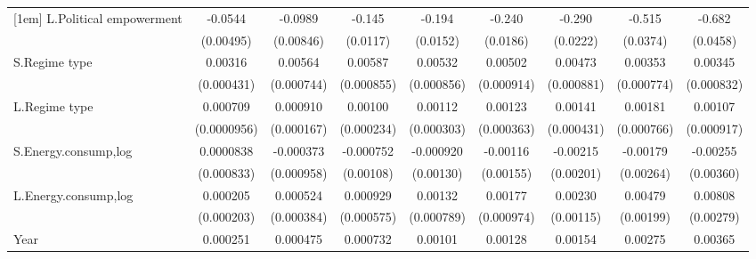 \begin{table}[htbp]
\begin{tabular}{l*{8}{c}}
[1em]
L.Political empowerment&     -0.0544\sym{***}&     -0.0989\sym{***}&      -0.145\sym{***}&      -0.194\sym{***}&      -0.240\sym{***}&      -0.290\sym{***}&      -0.515\sym{***}&      -0.682\sym{***}\\
                    &   (0.00495)         &   (0.00846)         &    (0.0117)         &    (0.0152)         &    (0.0186)         &    (0.0222)         &    (0.0374)         &    (0.0458)         \\
[1em]
S.Regime type       &     0.00316\sym{***}&     0.00564\sym{***}&     0.00587\sym{***}&     0.00532\sym{***}&     0.00502\sym{***}&     0.00473\sym{***}&     0.00353\sym{***}&     0.00345\sym{***}\\
                    &  (0.000431)         &  (0.000744)         &  (0.000855)         &  (0.000856)         &  (0.000914)         &  (0.000881)         &  (0.000774)         &  (0.000832)         \\
[1em]
L.Regime type       &    0.000709\sym{***}&    0.000910\sym{***}&     0.00100\sym{***}&     0.00112\sym{***}&     0.00123\sym{***}&     0.00141\sym{***}&     0.00181\sym{**} &     0.00107         \\
                    & (0.0000956)         &  (0.000167)         &  (0.000234)         &  (0.000303)         &  (0.000363)         &  (0.000431)         &  (0.000766)         &  (0.000917)         \\
[1em]
S.Energy.consump,log&   0.0000838         &   -0.000373         &   -0.000752         &   -0.000920         &    -0.00116         &    -0.00215         &    -0.00179         &    -0.00255         \\
                    &  (0.000833)         &  (0.000958)         &   (0.00108)         &   (0.00130)         &   (0.00155)         &   (0.00201)         &   (0.00264)         &   (0.00360)         \\
[1em]
L.Energy.consump,log&    0.000205         &    0.000524         &    0.000929         &     0.00132\sym{*}  &     0.00177\sym{*}  &     0.00230\sym{**} &     0.00479\sym{**} &     0.00808\sym{***}\\
                    &  (0.000203)         &  (0.000384)         &  (0.000575)         &  (0.000789)         &  (0.000974)         &   (0.00115)         &   (0.00199)         &   (0.00279)         \\
[1em]
Year                &    0.000251\sym{***}&    0.000475\sym{***}&    0.000732\sym{***}&     0.00101\sym{***}&     0.00128\sym{***}&     0.00154\sym{***}&     0.00275\sym{***}&     0.00365\sym{***}\\

\end{tabular}
\end{table}
